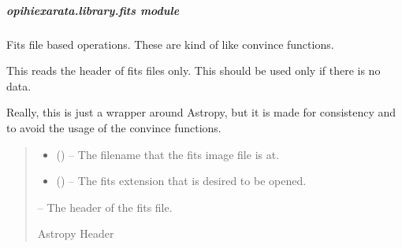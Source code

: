 \documentclass[letterpaper,11pt,english]{sphinxmanual}
\begin{document}
\sphinxstepscope


\subparagraph{opihiexarata.library.fits module}
\label{\detokenize{code/opihiexarata.library.fits:module-opihiexarata.library.fits}}\label{\detokenize{code/opihiexarata.library.fits:opihiexarata-library-fits-module}}\label{\detokenize{code/opihiexarata.library.fits::doc}}
\sphinxAtStartPar
Fits file based operations. These are kind of like convince functions.

\begin{savenotes}\begin{fulllineitems}
\label{\detokenize{code/opihiexarata.library.fits:opihiexarata.library.fits.read_fits_header}}
\pysigstartsignatures
{}
\pysigstopsignatures
\sphinxAtStartPar
This reads the header of fits files only. This should be used only if
there is no data.

\sphinxAtStartPar
Really, this is just a wrapper around Astropy, but it is made for
consistency and to avoid the usage of the convince functions.
\begin{quote}\begin{description}
\begin{itemize}
\item {} 
\sphinxAtStartPar
{} () – The filename that the fits image file is at.

\item {} 
\sphinxAtStartPar
{} (\sphinxstyleliteralemphasis{\sphinxupquote{, }}) – The fits extension that is desired to be opened.

\end{itemize}

\sphinxAtStartPar
{} – The header of the fits file.

\sphinxAtStartPar
Astropy Header

\end{description}\end{quote}

\end{fulllineitems}\end{savenotes}
\end{document}
